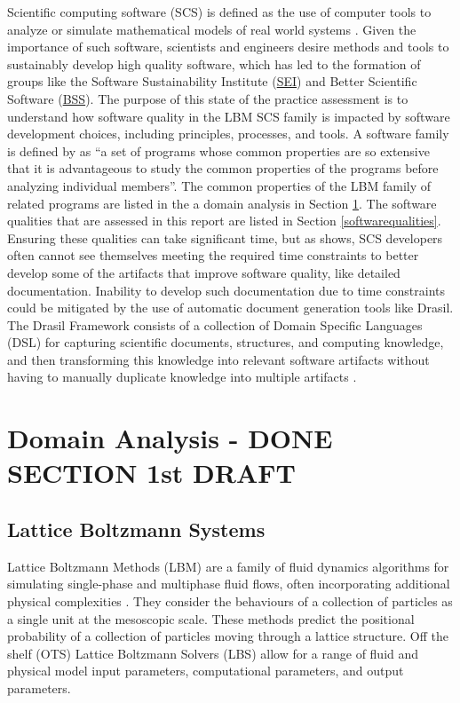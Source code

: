\documentclass[12pt, notitlepage]{article}
\begin{document}
Scientific computing software (SCS) is defined as the use of computer tools to analyze or simulate mathematical models of real world systems \citep{smith2006systematic}. Given the importance of such software, scientists and engineers desire methods and tools to sustainably develop high quality software, which has led to the formation of groups like the Software Sustainability Institute (\href{https://www.software.ac.uk/}{SEI}) and Better Scientific Software (\href{https://bssw.io/}{BSS}). The purpose of this state of the practice assessment is to understand how software quality in the LBM SCS family is impacted by software development choices, including principles, processes, and tools. A software family is defined
by \cite{parnas1976design} as “a set of programs whose common properties are so extensive that it is advantageous to study the common properties of the programs before analyzing individual members”. The common properties of the LBM family of related programs are listed in the a domain analysis in Section \ref{domainanalysis}. The software qualities that are assessed in this report are listed in Section \ref{softwarequalities}. Ensuring these qualities can take significant time, but as \cite{SmithEtAl2016} shows, SCS developers often cannot see themselves meeting the required time constraints to better develop some of the artifacts that improve software quality, like detailed documentation. Inability to develop such documentation due to time constraints could be mitigated by the use of automatic document generation tools like Drasil. The Drasil Framework consists of a collection of Domain Specific Languages (DSL) for capturing scientific documents, structures, and computing
knowledge, and then transforming this knowledge into relevant software artifacts without having to manually duplicate knowledge into multiple artifacts \citep{zhao2018}.

\newpage

\section{Domain Analysis - DONE SECTION 1st DRAFT}\label{domainanalysis}

\subsection{Lattice Boltzmann Systems}

Lattice Boltzmann Methods (LBM) are a family of fluid dynamics algorithms for simulating single-phase and multiphase fluid flows, often incorporating additional physical complexities \citep{chen1998lattice}. They consider the behaviours of a collection of particles as a single unit at the mesoscopic scale. These methods predict the positional probability of a collection of particles moving through a lattice structure. Off the shelf (OTS) Lattice Boltzmann Solvers (LBS) allow for a range of fluid and physical model input parameters, computational parameters, and output parameters.
\end{document}
